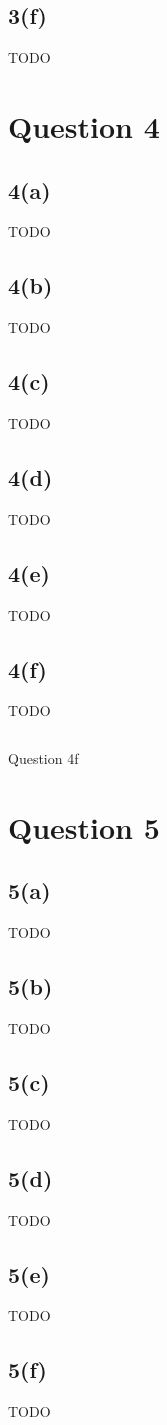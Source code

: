 \documentclass[10pt, a4paper,reqno]{article}
\begin{document}
\subsection*{3(f)}
TODO


%
%
\clearpage\section*{Question 4}

\subsection*{4(a)}
TODO

\subsection*{4(b)}
TODO

\subsection*{4(c)}
TODO

\subsection*{4(d)}
TODO

\subsection*{4(e)}
TODO

\subsection*{4(f)}
TODO

\begin{listing}
\inputminted[linenos]{python}{question_4f.py}
\caption{Question 4f}
\end{listing}


%
%
\clearpage\section*{Question 5}

\subsection*{5(a)}
TODO

\subsection*{5(b)}
TODO

\subsection*{5(c)}
TODO

\subsection*{5(d)}
TODO

\subsection*{5(e)}
TODO

\subsection*{5(f)}
TODO
\end{document}

